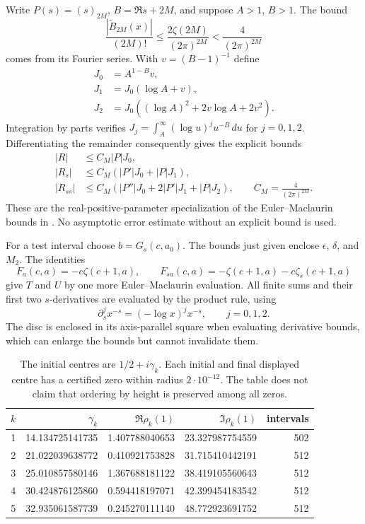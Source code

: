 Write $P(s)=(s)_{2M}$, $B=\Re s+2M$, and suppose $A>1$, $B>1$. The bound
\[
 \frac{|\widetilde B_{2M}(x)|}{(2M)!}
 \le\frac{2\zeta(2M)}{(2\pi)^{2M}}
 <\frac4{(2\pi)^{2M}}
\]
comes from its Fourier series. With $v=(B-1)^{-1}$ define
\[
\begin{aligned}
 J_0&=A^{1-B}v,\\
 J_1&=J_0(\log A+v),\\
 J_2&=J_0((\log A)^2+2v\log A+2v^2).
\end{aligned}
\]
Integration by parts verifies $J_j=\int_A^\infty(\log u)^ju^{-B}\,du$ for $j=0,1,2$. Differentiating the remainder consequently gives the explicit bounds
\begin{align*}
 |R|&\le C_M|P|J_0,\\
 |R_s|&\le C_M(|P'|J_0+|P|J_1),\\
 |R_{ss}|&\le C_M(|P''|J_0+2|P'|J_1+|P|J_2),
 \qquad C_M=\frac4{(2\pi)^{2M}}.
\end{align*}
These are the real-positive-parameter specialization of the Euler--Maclaurin bounds in \citet{Johansson}. No asymptotic error estimate without an explicit bound is used.

For a test interval choose $b=G_s(c,a_0)$. The bounds just given enclose $\epsilon$, $\delta$, and $M_2$. The identities
\[
 F_a(c,a)=-c\zeta(c+1,a),\qquad
 F_{sa}(c,a)=-\zeta(c+1,a)-c\zeta_s(c+1,a)
\]
give $T$ and $U$ by one more Euler--Maclaurin evaluation. All finite sums and their first two $s$-derivatives are evaluated by the product rule, using
\[
 \partial_s^j x^{-s}=(-\log x)^jx^{-s},\qquad j=0,1,2.
\]
The disc is enclosed in its axis-parallel square when evaluating derivative bounds, which can enlarge the bounds but cannot invalidate them.

\begin{table}[htbp]
\centering\small
\begin{tabular}{r r r r r}
\toprule
$k$ & $\gamma_k$ & $\Re\rho_k(1)$ & $\Im\rho_k(1)$ & intervals\\
\midrule
1&14.134725141735&1.407788040653&23.327987754559&502\\
2&21.022039638772&0.410921753828&31.715410442191&512\\
3&25.010857580146&1.367688181122&38.419105560643&512\\
4&30.424876125860&0.594418197071&42.399454183542&512\\
5&32.935061587739&0.245270111140&48.772923691752&512\\
\bottomrule
\end{tabular}
\caption{The initial centres are $1/2+i\gamma_k$. Each initial and final displayed centre has a certified zero within radius $2\cdot10^{-12}$. The table does not claim that ordering by height is preserved among all zeros.}\label{tab:paths}
\end{table}

